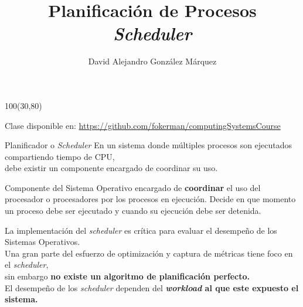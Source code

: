 \documentclass[aspectratio=169]{beamer}
\title{\Huge Planificación de Procesos\\ \emph{Scheduler}}
\author{David Alejandro González Márquez}
\date{}
\begin{document}
\begin{frame}[plain]
    \titlepage
    \begin{textblock}{100}(30,80)
    \begin{tcolorbox}[size=small,width=\textwidth,colback={gray!30},title={}]
    \begin{center}
     \scriptsize Clase disponible en: \url{https://github.com/fokerman/computingSystemsCourse}
    \end{center}
    \end{tcolorbox}
    \end{textblock}
\end{frame}

\begin{frame}{Planificador o \emph{Scheduler}}
    \small
    En un sistema donde múltiples procesos son ejecutados compartiendo tiempo de CPU,\\ debe existir un componente encargado de coordinar su uso.
    \pause
    \begin{center}
    \begin{tcolorbox}[size=small,width=0.85\textwidth,sharp corners,title={ \textcolor{naranjauca}{\emph{scheduler} o planificador} }]
    \small
    Componente del Sistema Operativo encargado de \textbf{coordinar} el uso del procesador o procesadores por los procesos en ejecución.
    Decide en que momento un proceso debe ser ejecutado y cuando su ejecución debe ser detenida.
    \end{tcolorbox}
    \end{center}
    \pause
    \bigskip
    La implementación del \emph{scheduler} es crítica para evaluar el desempeño de los Sistemas Operativos.\\
    \medskip
    Una gran parte del esfuerzo de optimización y captura de métricas tiene foco en el \emph{scheduler},\\
    sin embargo \textcolor{verdeuca}{\textbf{no existe un algoritmo de planificación perfecto.}}\\
    \medskip
    El desempeño de los \emph{scheduler} dependen del  \textcolor{verdeuca}{\textbf{\emph{workload} al que este expuesto el sistema.}}\\
\end{frame}
\end{document}
